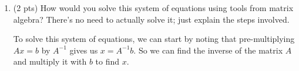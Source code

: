 \documentclass{./../../latex/tests}
\begin{document}
\begin{enumerate}
\begin{enumerate}
\textit{Necessary condition:} $A$ must be a square matrix, meaning the number of equations is equal to the number of variables; this condition is met here.

\textit{Sufficient condition:} $A$ must be non-singular (i.e., $|A| \neq 0$), indicating that the rows of $A$ are linearly independent or, equivalently, that each equation is linearly independent. \\

\item (2 pts) How would you solve this system of equations using tools from matrix algebra? There's no need to actually solve it; just explain the steps involved.

To solve this system of equations, we can start by noting that pre-multiplying $Ax =b$ by $A^{-1}$ gives us $x = A^{-1} b$. So we can find the inverse of the matrix $A$ and multiply it with $b$ to find $x$. \\~\\
\end{enumerate}


\end{enumerate}
\end{document}
